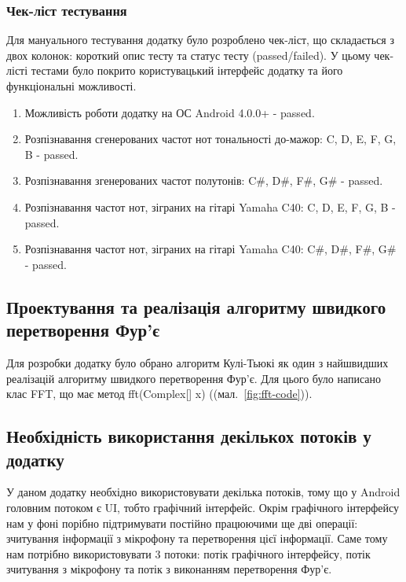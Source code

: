 \subsubsection{Чек-ліст тестування}

Для мануального тестування додатку було розроблено чек-ліст, що складається з двох колонок: короткий опис тесту та статус тесту (passed/failed). У цьому чек-лісті тестами було покрито користувацький інтерфейс додатку та його функціональні можливості.

\begin{enumerate}
    \item Можливість роботи додатку на ОС Android 4.0.0+ - passed.
    \item Розпізнавання сгенерованих частот нот тональності до-мажор: C, D, E, F, G, B - passed.
    \item Розпізнавання згенерованих частот полутонів: C\#, D\#, F\#, G\# - passed.
    \item Розпізнавання частот нот, зіграних на гітарі Yamaha C40: C, D, E, F, G, B - passed.
    \item Розпізнавання частот нот, зіграних на гітарі Yamaha C40: C\#, D\#, F\#, G\# - passed.
\end{enumerate}


\subsection{Проектування та реалізація алгоритму швидкого перетворення Фур'є}


Для розробки додатку було обрано алгоритм Кулі-Тьюкі як один з найшвидших реалізацій алгоритму швидкого перетворення Фур'є. Для цього було написано клас FFT, що має метод fft(Complex[] x) ((мал.~\ref{fig:fft-code})).

\subsection{Необхідність використання декількох потоків у додатку}

У даном додатку необхідно використовувати декілька потоків, тому що у Android головним потоком є UI, тобто графічний інтерфейс. Окрім графічного інтерфейсу нам у фоні порібно підтримувати постійно працюючими ще дві операції: зчитування інформації з мікрофону та перетворення цієї інформації. Саме тому нам потрібно використовувати 3 потоки: потік графічного інтерфейсу, потік зчитування з мікрофону та потік з виконанням перетворення Фур'є. 

